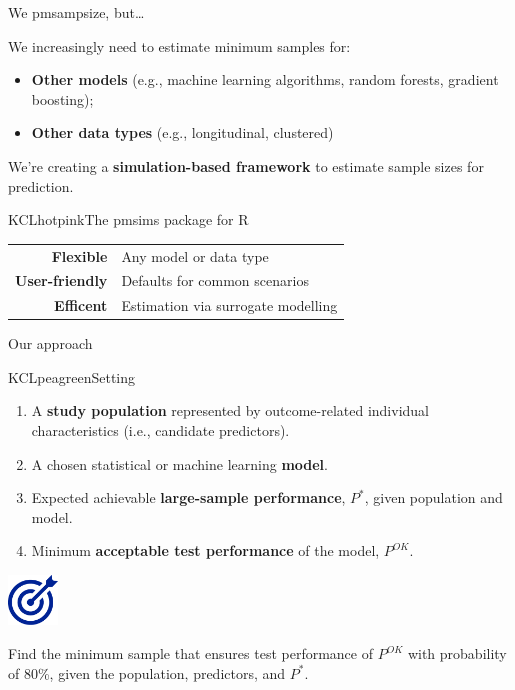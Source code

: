 \documentclass[11pt]{beamer}
\newcommand*{\colitem}[2]{%
    \item[\textcolor{#1}{\textbullet}] \textcolor{#1}{#2}
}
\newcommand{\sgap}{\vspace{0.5em}}
\newcommand*{\img}[1]{%
    \raisebox{-.3\baselineskip}{%
        \texttt{[image: \#1]}%
    }%
}
\begin{document}
\begin{frame}[c]{We \img{figures/heart.png} pmsampsize, but\ldots}

	\large
	We increasingly need to estimate minimum samples for:\ \sgap
	\begin{itemize}
		\colitem{KCLpurple}{\textbf{Other models} (e.g., machine learning algorithms, random
			forests, gradient boosting);}
		\colitem{KCLseablue}{\textbf{Other data types} (e.g., longitudinal, clustered)}
	\end{itemize}

    \vspace{0.5em}
    We're creating a \textbf{simulation-based framework} to estimate sample
    sizes for prediction.
    \vspace{0.5em}

	\begin{cbox}{KCLhotpink}{The pmsims package for R}
		\begin{tabular}{rp{}}
			\textbf{Flexible}      & Any model or data type             \\
			\textbf{User-friendly} & Defaults for common scenarios      \\
			\textbf{Efficent}      & Estimation via surrogate modelling
		\end{tabular}
	\end{cbox}

\end{frame}

\begin{frame}[c]{Our approach}
    \begin{cbox}[bottom=4mm]{KCLpeagreen}{Setting}
		\begin{enumerate}
			\setlength{\itemsep}{7pt}
            \item A \textbf{study population} represented by outcome-related individual
			      characteristics (i.e., candidate predictors).
              \item A chosen statistical or machine learning \textbf{model}.
              \item Expected achievable \textbf{large-sample performance}, $P^{*}$, given population and model.
              \item Minimum \textbf{acceptable test performance} of the model, $P^{OK}$.
		\end{enumerate}
	\end{cbox}

	\sgap
	\centering
	\includegraphics[height=3.6em]{figures/target.pdf}
	\hspace{0.7em}
	\large
	\parbox[b]{0.8\textwidth}{ \raggedright \textcolor{KCLpantone}{ Find the
	    minimum sample that ensures test performance of $P^{OK}$ with
	    probability of 80\%, given the population, predictors, and $P^{*}$. }
	    }


\end{frame}
\end{document}
